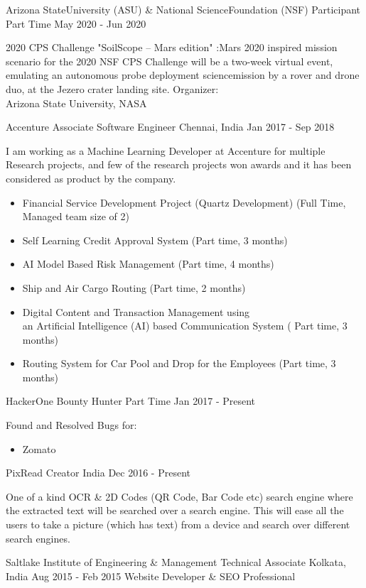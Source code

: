 \begin{cventries}
	\cventry
	{Arizona StateUniversity (ASU) \& National ScienceFoundation (NSF)}
	{Participant}
	{Part Time}
	{May 2020 - Jun 2020}
	{\begin{flushleft}
			2020 CPS Challenge "SoilScope -- Mars edition" :\newline Mars 2020 inspired mission scenario for the 2020 NSF CPS Challenge will be a two-week virtual event, emulating an autonomous probe deployment sciencemission by a rover and drone duo, at the Jezero crater landing site.\newline
			Organizer:\\
			Arizona State University, NASA
		\end{flushleft}}


	\cventry
	{Accenture}
	{Associate Software Engineer}
	{Chennai, India}
	{Jan 2017 - Sep 2018}
	{	\begin{flushleft}
			I am working as a Machine Learning Developer at Accenture for multiple Research projects, and few of the research projects won awards and it has been considered as product by the company.
			\begin{itemize}
				\item Financial Service Development Project (Quartz Development) (Full Time, Managed team size of 2)
				\item Self Learning Credit Approval System (Part time, 3 months)
				\item AI Model Based Risk Management (Part time, 4 months)
				\item Ship and Air Cargo Routing (Part time, 2 months)
				\item Digital Content and Transaction Management using\\ an Artificial Intelligence (AI) based Communication System ( Part time, 3 months)
				\item Routing System for Car Pool and Drop for the Employees (Part time, 3 months)
			\end{itemize}
		\end{flushleft}
	}

	\cventry
	{HackerOne}
	{Bounty Hunter}
	{Part Time}
	{Jan 2017 - Present}
	{
		\begin{flushleft}
			Found and Resolved Bugs for:
			\begin{itemize}
				\item {Zomato}
			\end{itemize}
		\end{flushleft}
	}

	\cventry
	{PixRead}
	{Creator}
	{India}
	{Dec 2016 - Present}
	{\begin{flushleft}
			One of a kind OCR \& 2D Codes (QR Code, Bar Code etc) search engine where the extracted text will
			be searched over a search engine. This will ease all the users to take a picture (which has text) from a
			device and search over different search engines.
		\end{flushleft}}

	\cventry
	{Saltlake Institute of Engineering \& Management}
	{Technical Associate}
	{Kolkata, India}
	{Aug 2015 - Feb 2015}
	{Website Developer \& SEO Professional}


\end{cventries}